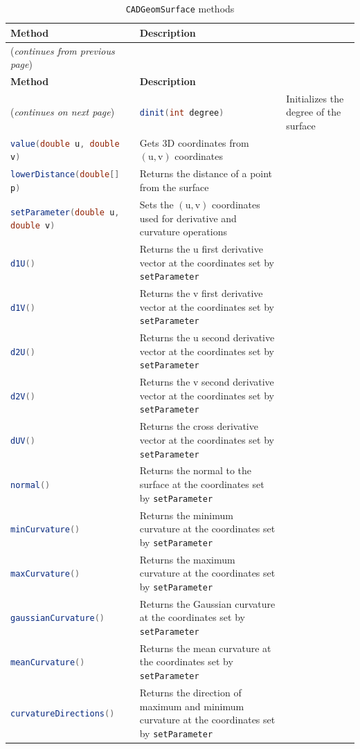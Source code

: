\begin{longtable}[H]{p{5.7cm}p{8.8cm}}
\toprule
\textbf{Method} & \textbf{Description} \\
\midrule
\endfirsthead
%
{({\itshape continues from previous page})} & \\
\toprule
\textbf{Method} & \textbf{Description}\\
\midrule
\endhead
%
\midrule 
{({\itshape continues on next page})} & 
\endfoot
%
\bottomrule
\caption{\lstinline[language=Java]!CADGeomSurface! methods}
\endlastfoot
%
\lstinline[language=Java]!dinit(int degree)! & Initializes the degree of the surface \\[0.5cm]
\lstinline[language=Java]!value(double u, double v)! & Gets 3D coordinates from $(\text{u}, \text{v})$ coordinates \\[0.5cm]
\lstinline[language=Java]!lowerDistance(double[] p)! & Returns the distance of a point from the surface \\[0.5cm]
\lstinline[language=Java]!setParameter(double u, double v)! & Sets the $(\text{u}, \text{v})$ coordinates used for derivative and curvature operations \\[0.2cm]
\lstinline[language=Java]!d1U()! & Returns the u first derivative vector at the coordinates set by \lstinline[language=Java]!setParameter! \\[0.2cm]
\lstinline[language=Java]!d1V()! & Returns the v first derivative vector at the coordinates set by \lstinline[language=Java]!setParameter! \\[0.2cm]
\lstinline[language=Java]!d2U()! & Returns the u second derivative vector at the coordinates set by \lstinline[language=Java]!setParameter! \\[0.2cm]
\lstinline[language=Java]!d2V()! & Returns the v second derivative vector at the coordinates set by \lstinline[language=Java]!setParameter! \\[0.2cm]
\lstinline[language=Java]!dUV()! & Returns the cross derivative vector at the coordinates set by \lstinline[language=Java]!setParameter! \\[0.2cm]
\lstinline[language=Java]!normal()! & Returns the normal to the surface at the coordinates set by \lstinline[language=Java]!setParameter! \\[0.2cm]
\lstinline[language=Java]!minCurvature()! & Returns the minimum curvature at the coordinates set by \lstinline[language=Java]!setParameter! \\[0.2cm]
\lstinline[language=Java]!maxCurvature()! & Returns the maximum curvature at the coordinates set by \lstinline[language=Java]!setParameter! \\[0.2cm]
\lstinline[language=Java]!gaussianCurvature()! & Returns the Gaussian curvature at the coordinates set by \lstinline[language=Java]!setParameter! \\[0.2cm]
\lstinline[language=Java]!meanCurvature()! & Returns the mean curvature at the coordinates set by \lstinline[language=Java]!setParameter! \\[0.2cm]
\lstinline[language=Java]!curvatureDirections()! & Returns the direction of maximum and minimum curvature at the coordinates set by \lstinline[language=Java]!setParameter!
\label{tab:CADGeomSurfMesh}
\end{longtable}
